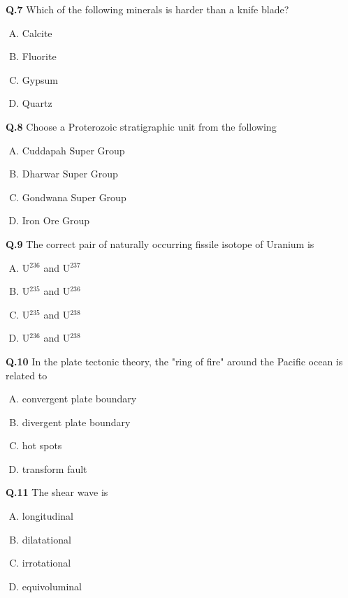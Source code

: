 \textbf{Q.7} Which of the following minerals is harder than a knife blade?
\begin{multicols}{4}

\begin{enumerate}[(A)]
\item Calcite \item  Fluorite \item  Gypsum \item  Quartz
\end{enumerate}
\end{multicols}

\textbf{Q.8} Choose a Proterozoic stratigraphic unit from the following
\begin{enumerate}[(A)]
\item Cuddapah Super Group \item  Dharwar Super Group
\item Gondwana Super Group \item  Iron Ore Group
\end{enumerate}

\textbf{Q.9} The correct pair of naturally occurring fissile isotope of Uranium is
\begin{enumerate}[(A)]
\item U$^{236}$ and U$^{237}$ \item  U$^{235}$ and U$^{236}$
\item U$^{235}$ and U$^{238}$ \item  U$^{236}$ and U$^{238}$
\end{enumerate}

\textbf{Q.10} In the plate tectonic theory, the "ring of fire" around the Pacific ocean is related to
\begin{enumerate}[(A)]
\item convergent plate boundary \item  divergent plate boundary
\item hot spots \item  transform fault
\end{enumerate}

\textbf{Q.11} The shear wave is
\begin{multicols}{4}
    

\begin{enumerate}[(A)]
\item longitudinal \item  dilatational \item  irrotational \item  equivoluminal
\end{enumerate}
\end{multicols}


